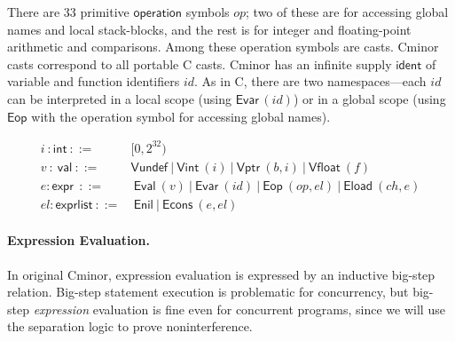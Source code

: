 \documentclass{llncs}
\newcommand{\cminor}{Cminor}
\newcommand{\tyface}[1]{\ensuremath{\mathsf{#1}}}
\newcommand{\val}{\tyface{val}}
\newcommand{\Vundef}{\tyface{Vundef}}
\newcommand{\Vint}{\tyface{Vint}}
\newcommand{\Vfloat}{\tyface{Vfloat}}
\newcommand{\Vptr}{\tyface{Vptr}}
\newcommand{\expr}{\tyface{expr}}
\newcommand{\exprlist}{\tyface{exprlist}}
\newcommand{\Eval}{\tyface{Eval}}
\newcommand{\Evar}{\tyface{Evar}}
\newcommand{\Eop}{\tyface{Eop}}
\newcommand{\Eload}{\tyface{Eload}}
\newcommand{\Enil}{\tyface{Enil}}
\newcommand{\Econs}{\tyface{Econs}}
\newcommand{\id}{\ensuremath{\mathit{id}}}
\begin{document}
There are 33 primitive \tyface{operation} symbols $\mathit{op}$;
two of these are for accessing global names and
local stack-blocks, and the rest is for integer and
floating-point arithmetic and comparisons.
Among these operation symbols are casts.
\cminor{} casts correspond to all portable C casts.
\cminor{} has an infinite supply \tyface{ident} of
variable and function identifiers $\mathit{id}$.  
As in C, there are two namespaces---each 
$\mathit{id}$ can be interpreted in a local
scope (using $\Evar\,(\mathit{id})$) or in a global scope
(using 
$\Eop$ with the operation symbol for accessing global names).

\vspace{-20pt}
\begin{align*}
i~:\tyface{int} ~ ::= ~ & [0,2^{32}) \\
 v~:~\val ~ ::= ~ & \Vundef{} ~|~ \Vint{}~(i)
~|~ \Vptr{}~(b,i) ~|~ \Vfloat{} ~(f)\\
e:\expr ~  ~ ::= & ~ \Eval~(v) ~|~
\Evar~(\id{}) ~|~ \Eop~(\mathit{op}, \mathit{el})~|~ 
\Eload~(\mathit{ch},e )\\
\mathit{el}:\exprlist{} ~ ::= & ~\Enil ~|~ \Econs~(e,\mathit{el})
\end{align*}

\paragraph{Expression Evaluation.}
In original \cminor{}, expression evaluation is expressed by an inductive big-step relation.
Big-step statement execution is problematic for concurrency, but
big-step \emph{expression} evaluation is fine even for concurrent
programs, since we will use the separation logic to prove
noninterference.
\end{document}
